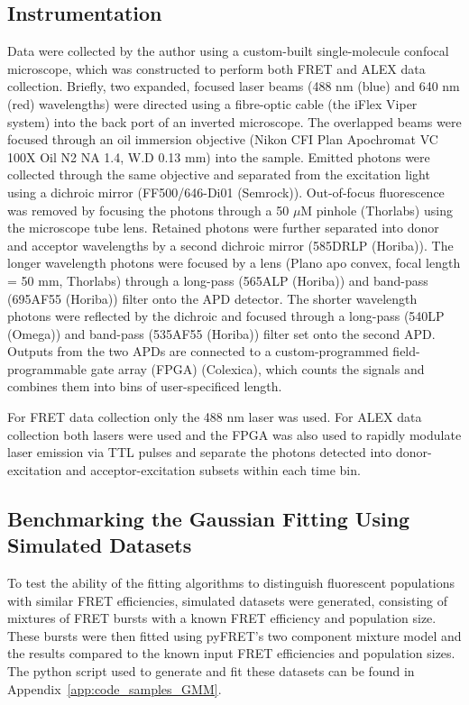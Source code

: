 \subsection{Instrumentation}
\label{sect:instrumentation}
Data were collected by the author using a custom-built single-molecule confocal microscope, which was constructed to perform both FRET and ALEX data collection. Briefly, two expanded, focused laser beams (488 nm (blue) and 640 nm (red) wavelengths) were directed using a fibre-optic cable (the iFlex Viper system) into the back port of an inverted microscope. The overlapped beams were focused through an oil immersion objective (Nikon CFI Plan Apochromat VC 100X Oil N2 NA 1.4, W.D 0.13 mm) into the sample. Emitted photons were collected through the same objective and separated from the excitation light using a dichroic mirror (FF500/646-Di01 (Semrock)). Out-of-focus fluorescence was removed by focusing the photons through a 50 $\mu$M pinhole (Thorlabs) using the microscope tube lens. Retained photons were further separated into donor and acceptor wavelengths by a second dichroic mirror (585DRLP (Horiba)). The longer wavelength photons were focused by a lens (Plano apo convex, focal length = 50 mm, Thorlabs) through a long-pass (565ALP (Horiba)) and band-pass (695AF55 (Horiba)) filter onto the APD detector. The shorter wavelength photons were reflected by the dichroic and focused through a long-pass (540LP (Omega)) and band-pass (535AF55 (Horiba)) filter set onto the second APD. Outputs from the two APDs are connected to a custom-programmed field-programmable gate array (FPGA) (Colexica), which counts the signals and combines them into bins of user-specificed length. 

For FRET data collection only the 488 nm laser was used. For ALEX data collection both lasers were used and the FPGA was also used to rapidly modulate laser emission via TTL pulses and separate the photons detected into donor-excitation and acceptor-excitation subsets within each time bin.  

\subsection{Benchmarking the Gaussian Fitting Using Simulated Datasets}
\label{subsec:benchmarking-gaussian}
To test the ability of the fitting algorithms to distinguish fluorescent populations with similar FRET efficiencies,  simulated datasets were generated, consisting of mixtures of FRET bursts with a known FRET efficiency and population size. These bursts were then fitted using pyFRET's two component mixture model and the results compared to the known input FRET efficiencies and population sizes. The python script used to generate and fit these datasets can be found in Appendix~\ref{app:code_samples_GMM}.

